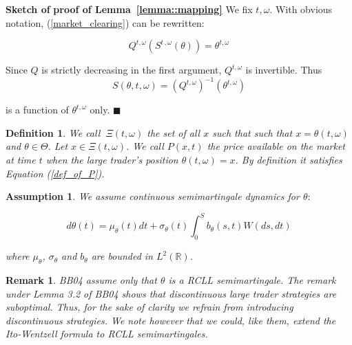 \documentclass{article}
\newtheorem{definition}{Definition}
\newtheorem{remark}{Remark}
\newtheorem{assumption}{Assumption}
\begin{document}
\textbf{Sketch of} \textbf{proof of Lemma~\ref{lemma::mapping}} We fix $%
t,\omega $. With obvious notation, (\ref{market_clearing}) can be rewritten:

\begin{equation*}
Q^{t,\omega }(S^{t\,,\omega }(\theta ))=\theta ^{t,\omega }
\end{equation*}

Since $Q$ is strictly decreasing in the first argument, $Q^{t,\omega }$ is
invertible. Thus%
\begin{equation*}
S(\theta ,t,\omega )=(Q^{t,\omega })^{-1}(\theta ^{t,\omega })
\end{equation*}

is a function of $\theta ^{t,\omega }$ only. $\blacksquare $



\begin{definition}
We call $\ \Xi (t,\omega )$ the set of all $x$ such that such that $x=\theta
(t,\omega )$ and $\theta \in \Theta $. Let $x\in \Xi (t,\omega )$. We call $%
P(x,t)$ the price available on the market at time $t$ when the large
trader's position $\theta (t,\omega )=x$. By definition it satisfies
Equation (\ref{def_of_P}).
\end{definition}



\begin{assumption}
\label{ass::theta_semimartingale} We assume continuous semimartingale
dynamics for $\theta :$

\begin{equation*}
d\theta (t)=\mu _{\theta }(t)dt+\sigma _{\theta }(t)\int_{0}^{S}b_{\theta
}(s,t)W(ds,dt)
\end{equation*}

where $\mu _{\theta }$, $\sigma _{\theta }$ and $b_{\theta }$ are bounded in
$L^{2}(\mathbb{R})$.
\end{assumption}



\begin{remark}
BB04 assume only that $\theta $ is a RCLL semimartingale. The remark under
Lemma 3.2 of BB04 shows that discontinuous large trader strategies are
suboptimal. Thus, for the sake of clarity we refrain from introducing
discontinuous strategies. We note however that we could, like them, extend
the Ito-Wentzell formula to RCLL semimartingales.
\end{remark}
\end{document}
